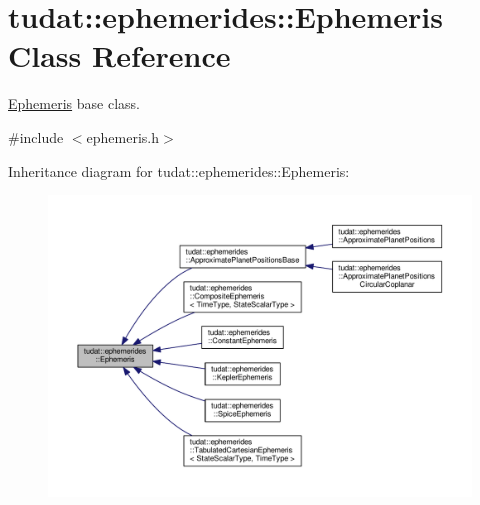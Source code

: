 \hypertarget{classtudat_1_1ephemerides_1_1Ephemeris}{}\section{tudat\+:\+:ephemerides\+:\+:Ephemeris Class Reference}
\label{classtudat_1_1ephemerides_1_1Ephemeris}


\hyperlink{classtudat_1_1ephemerides_1_1Ephemeris}{Ephemeris} base class.  




{\ttfamily \#include $<$ephemeris.\+h$>$}



Inheritance diagram for tudat\+:\+:ephemerides\+:\+:Ephemeris\+:
\nopagebreak
\begin{figure}[H]
\begin{center}
\leavevmode
\includegraphics[width=350pt]{classtudat_1_1ephemerides_1_1Ephemeris__inherit__graph}
\end{center}
\end{figure}
